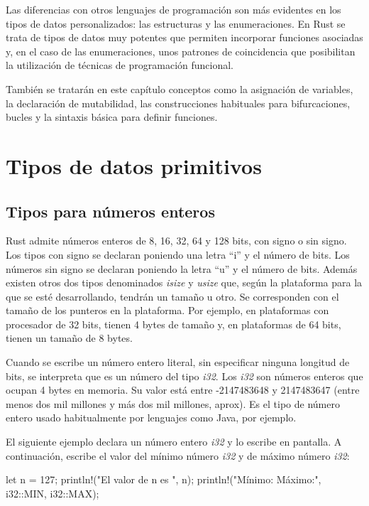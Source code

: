 \begin{Resumen}
Las diferencias con otros lenguajes de programación son más evidentes en los tipos de datos personalizados: las estructuras y las enumeraciones. En Rust se trata de tipos de datos muy potentes que permiten incorporar funciones asociadas y, en el caso de las enumeraciones, unos patrones de coincidencia que posibilitan la utilización de técnicas de programación funcional.

\smallskip

También se tratarán en este capítulo conceptos como la asignación de variables, la declaración de mutabilidad, las construcciones habituales para bifurcaciones, bucles y la sintaxis básica para definir funciones.
 
\end{Resumen}


\section{Tipos de datos primitivos}

\subsection{Tipos para números enteros}
\label{sec_numeros_enteros}
Rust admite números enteros de 8, 16, 32, 64 y 128 bits, con signo o sin signo. Los tipos con signo se declaran poniendo una letra ``i'' y el número de bits. Los números sin signo se declaran poniendo la letra ``u'' y el número de bits. Además existen otros dos tipos denominados \textit{isize} y \textit{usize} que, según la plataforma para la que se esté desarrollando, tendrán un tamaño u otro. Se corresponden con el tamaño de los punteros en la plataforma. Por ejemplo, en plataformas con procesador de 32 bits, tienen 4 bytes de tamaño y, en plataformas de 64 bits, tienen un tamaño de 8 bytes. 

Cuando se escribe un número entero literal, sin especificar ninguna longitud de bits, se interpreta que es un número del tipo \textit{i32}. Los \textit{i32} son números enteros que ocupan 4 bytes en memoria. Su valor está entre -2147483648 y 2147483647 (entre menos dos mil millones y más dos mil millones, aprox). Es el tipo de número entero usado habitualmente por lenguajes como Java, por ejemplo. 

El siguiente ejemplo declara un número entero \textit{i32} y lo escribe en pantalla. A continuación, escribe el valor del mínimo número \textit{i32} y de máximo número \textit{i32}:

\vspace{0.7em}
\begin{Codigo}
let n = 127;
println!("El valor de n es {}", n);
println!("Mínimo:{} Máximo:{}", i32::MIN, i32::MAX);
\end{Codigo}

